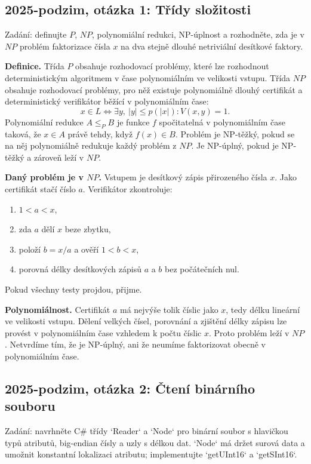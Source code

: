 \subsection{2025-podzim, otázka 1: Třídy složitosti}

Zadání: definujte $P$, $NP$, polynomiální redukci, NP-úplnost a rozhodněte, zda je v $NP$
problém faktorizace čísla $x$ na dva stejně dlouhé netriviální desítkové faktory.

\begin{odpoved}
\textbf{Definice.} Třída $P$ obsahuje rozhodovací problémy, které lze rozhodnout
deterministickým algoritmem v čase polynomiálním ve velikosti vstupu. Třída $NP$ obsahuje
rozhodovací problémy, pro něž existuje polynomiálně dlouhý certifikát a deterministický
verifikátor běžící v polynomiálním čase:
\[
x\in L\iff \exists y,\ |y|\le p(|x|): V(x,y)=1.
\]
Polynomiální redukce $A\le_P B$ je funkce $f$ spočitatelná v polynomiálním čase taková, že
$x\in A$ právě tehdy, když $f(x)\in B$. Problém je NP-těžký, pokud se na něj polynomiálně
redukuje každý problém z $NP$. Je NP-úplný, pokud je NP-těžký a zároveň leží v $NP$.

\textbf{Daný problém je v $NP$.} Vstupem je desítkový zápis přirozeného čísla $x$. Jako
certifikát stačí číslo $a$. Verifikátor zkontroluje:
\begin{enumerate}
  \item $1<a<x$,
  \item zda $a$ dělí $x$ beze zbytku,
  \item položí $b=x/a$ a ověří $1<b<x$,
  \item porovná délky desítkových zápisů $a$ a $b$ bez počátečních nul.
\end{enumerate}
Pokud všechny testy projdou, přijme.

\textbf{Polynomiálnost.} Certifikát $a$ má nejvýše tolik číslic jako $x$, tedy délku
lineární ve velikosti vstupu. Dělení velkých čísel, porovnání a zjištění délky zápisu lze
provést v polynomiálním čase vzhledem k počtu číslic $x$. Proto problém leží v $NP$.
Netvrdíme tím, že je NP-úplný, ani že neumíme faktorizovat obecně v polynomiálním čase.
\end{odpoved}

\subsection{2025-podzim, otázka 2: Čtení binárního souboru}

Zadání: navrhněte C\# třídy `Reader` a `Node` pro binární soubor s hlavičkou typů atributů,
big-endian čísly a uzly s délkou dat. `Node` má držet surová data a umožnit konstantní
lokalizaci atributu; implementujte `getUInt16` a `getSInt16`.

